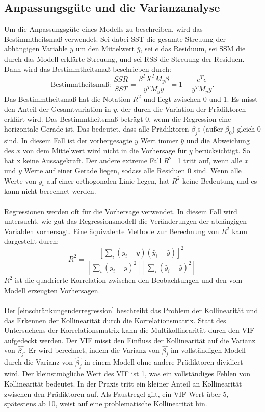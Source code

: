 \subsection{Anpassungsgüte und die Varianzanalyse}
\label{AnpassungsgüteUndDieVarianzanalyse}
Um die Anpassungsgüte eines Modells zu beschreiben, wird das Bestimmtheitsmaß verwendet. Sei dabei \ac{SST} die gesamte Streuung der abhängigen Variable \( y \) um den Mittelwert \( \bar{y} \), sei \(e\) das Residuum, sei \ac{SSM} die durch das Modell erklärte Streuung, und sei \ac{RSS} die Streuung der Residuen. Dann wird das Bestimmtheitsmaß beschrieben durch: 
\begin{equation}
\text{Bestimmtheitsmaß: }\frac{SSR}{SST} = \frac{\beta^{T}X^{T}M_{y}\beta}{y^{T}M_{y}y} = 1 - \frac{e^{T}e}{y^{T}M_{y}y}.
\label{R2kurz}
\end{equation}
Das Bestimmtheitsmaß hat die Notation  \( R^2 \) und liegt zwischen 0 und 1. Es misst den Anteil der Gesamtvariation in \(y\), der durch die Variation der Prädiktoren erklärt wird. Das Bestimmtheitsmaß beträgt 0, wenn die Regression eine horizontale Gerade ist. Das bedeutet, dass alle Prädiktoren $\beta_j$s (außer $\beta_0$) gleich 0 sind. In diesem Fall ist der vorhergesagte $y$ Wert immer $\bar{y}$ und die Abweichung des $x$ von dem Mittelwert wird nicht in die Vorhersage für $y$ berücksichtigt. So hat x keine Aussagekraft. Der andere extreme Fall \(R^2\)=1 tritt auf, wenn alle \(x\) und \(y\) Werte auf einer Gerade liegen, sodass alle Residuen 0 sind. Wenn alle Werte von $y_i$ auf einer orthogonalen Linie liegen, hat $R^2$ keine Bedeutung und es kann nicht berechnet werden.  \\\\ 
Regressionen werden oft für die Vorhersage verwendet. 
In diesem Fall wird untersucht, wie gut das Regressionsmodell die Veränderungen der abhängigen Variablen vorhersagt. Eine äquivalente Methode zur Berechnung von $R^2$ kann dargestellt durch: 
\begin{equation}
R^2 = \frac{\left[\sum_{i}(y_i - \bar{y})(\hat{y}_i - \hat{y})\right]^2}{\left[\sum_{i}(y_i - \bar{y})^2\right]\left[\sum_{i}(\hat{y}_i - \hat{y})^2\right]}
\label{R2Formel}
\end{equation}
$R^2$ ist die quadrierte Korrelation zwischen den Beobachtungen und den vom Modell erzeugten Vorhersagen.\\\\
Der \autoref{einschränkungenderregression} beschreibt das Problem der Kollinearität und das Erkennen der Kollinearität durch die Korrelationsmatrix. Statt des Untersuchens der Korrelationsmatrix kann die Multikollinearität durch den \ac{VIF} aufgedeckt werden. Der \ac{VIF} misst den Einfluss der Kollinearität auf die Varianz von $\hat{\beta_j}$. Er wird berechnet, indem die Varianz von $\hat{\beta_j}$ im vollständigen Modell durch die Varianz von $\hat{\beta_j}$ in einem Modell ohne andere Prädiktoren dividiert wird. Der kleinstmögliche Wert des \ac{VIF} ist 1, was ein vollständiges Fehlen von Kollinearität bedeutet. In der Praxis tritt ein kleiner Anteil an Kollinearität zwischen den Prädiktoren auf. Als Faustregel gilt, ein \ac{VIF}-Wert über 5, spätestens ab 10, weist auf eine problematische Kollinearität hin. \\\\
